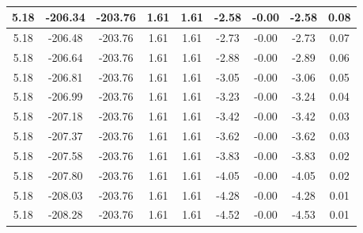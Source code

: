 \begin{table}[htbp]
\begin{adjustbox}{angle=90}
\begin{tabular}{|c|c|c|c|c|c|c|c|c|}
 5.18 & -206.34 & -203.76 & 1.61 & 1.61 & -2.58 & -0.00 & -2.58 & 0.08\\ \hline
 5.18 & -206.48 & -203.76 & 1.61 & 1.61 & -2.73 & -0.00 & -2.73 & 0.07\\ \hline
 5.18 & -206.64 & -203.76 & 1.61 & 1.61 & -2.88 & -0.00 & -2.89 & 0.06\\ \hline
 5.18 & -206.81 & -203.76 & 1.61 & 1.61 & -3.05 & -0.00 & -3.06 & 0.05\\ \hline
 5.18 & -206.99 & -203.76 & 1.61 & 1.61 & -3.23 & -0.00 & -3.24 & 0.04\\ \hline
 5.18 & -207.18 & -203.76 & 1.61 & 1.61 & -3.42 & -0.00 & -3.42 & 0.03\\ \hline
 5.18 & -207.37 & -203.76 & 1.61 & 1.61 & -3.62 & -0.00 & -3.62 & 0.03\\ \hline
 5.18 & -207.58 & -203.76 & 1.61 & 1.61 & -3.83 & -0.00 & -3.83 & 0.02\\ \hline
 5.18 & -207.80 & -203.76 & 1.61 & 1.61 & -4.05 & -0.00 & -4.05 & 0.02\\ \hline
 5.18 & -208.03 & -203.76 & 1.61 & 1.61 & -4.28 & -0.00 & -4.28 & 0.01\\ \hline
 5.18 & -208.28 & -203.76 & 1.61 & 1.61 & -4.52 & -0.00 & -4.53 & 0.01\\ \hline
            \end{tabular}
        \end{adjustbox}
        \caption{}
        \label{}
    \end{table}
    